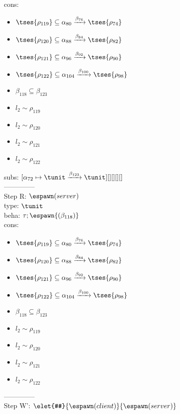 \documentclass[12pt]{article}
\begin{document}
 \\ cons: \begin{itemize}
\item $  \tses{ \rho_{119}} \subseteq \alpha_{80} \xrightarrow{\beta_{76}}  \tses{ \rho_{74}} $
\item $  \tses{ \rho_{120}} \subseteq \alpha_{88} \xrightarrow{\beta_{84}}  \tses{ \rho_{82}} $
\item $  \tses{ \rho_{121}} \subseteq \alpha_{96} \xrightarrow{\beta_{92}}  \tses{ \rho_{90}} $
\item $  \tses{ \rho_{122}} \subseteq \alpha_{104} \xrightarrow{\beta_{100}}  \tses{ \rho_{98}} $
\item $ \beta_{118} \subseteq \beta_{123} $
\item $ l_{2} \sim\rho_{119} $
\item $ l_{2} \sim\rho_{120} $
\item $ l_{2} \sim\rho_{121} $
\item $ l_{2} \sim\rho_{122} $
\end{itemize}
 subs:  $ [ \alpha_{72}\mapsto\tunit \xrightarrow{\beta_{123}} \tunit] [] [] [] [] $ 
  \\--------------\\ 
Step R: $ \espawn (server) $\\
  type: $ \tunit $ 
\\  beha: $ \tau; \espawn{ (\beta_{118})} $ 
\\  cons: \begin{itemize}
\item $  \tses{ \rho_{119}} \subseteq \alpha_{80} \xrightarrow{\beta_{76}}  \tses{ \rho_{74}} $
\item $  \tses{ \rho_{120}} \subseteq \alpha_{88} \xrightarrow{\beta_{84}}  \tses{ \rho_{82}} $
\item $  \tses{ \rho_{121}} \subseteq \alpha_{96} \xrightarrow{\beta_{92}}  \tses{ \rho_{90}} $
\item $  \tses{ \rho_{122}} \subseteq \alpha_{104} \xrightarrow{\beta_{100}}  \tses{ \rho_{98}} $
\item $ \beta_{118} \subseteq \beta_{123} $
\item $ l_{2} \sim\rho_{119} $
\item $ l_{2} \sim\rho_{120} $
\item $ l_{2} \sim\rho_{121} $
\item $ l_{2} \sim\rho_{122} $
\end{itemize} 
  --------------\\ 
Step W': $ \elet{#}{\espawn (client)}{\espawn (server)} $\\
\end{document}
